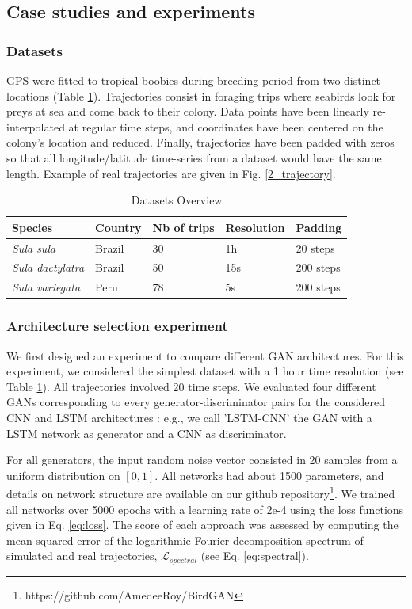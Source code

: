 \documentclass{article}
\begin{document}
\subsection{Case studies and experiments}
\subsubsection{Datasets}
GPS were fitted to tropical boobies during breeding period from two distinct locations (Table \ref{tab_data}). Trajectories consist in foraging trips where seabirds look for preys at sea and come back to their colony. Data points have been linearly re-interpolated at regular time steps, and coordinates have been centered on the colony's location and reduced. Finally, trajectories have been padded with zeros so that all longitude/latitude time-series from a dataset would have the same length. Example of real trajectories are given in Fig. \ref{2_trajectory}.

\begin{table}[h]
 \caption{Datasets Overview}
  \centering
  \begin{tabular}{lllll}
    \toprule
    Species  &  Country  & Nb of trips &  Resolution & Padding \\
    \midrule
    \textit{Sula sula} & Brazil & 30 & 1h & 20 steps \\
    \textit{Sula dactylatra} & Brazil & 50 & 15s & 200 steps\\
    \textit{Sula variegata} & Peru & 78 & 5s & 200 steps \\
    \bottomrule
  \end{tabular}
  \label{tab_data}
\end{table}

\subsubsection{Architecture selection experiment}
We first designed an experiment to compare different GAN architectures. For this experiment, we considered the simplest dataset with a 1 hour time resolution (see Table \ref{tab_data}). All trajectories involved 20 time steps. We evaluated four different GANs corresponding to every generator-discriminator pairs for the considered CNN and LSTM architectures : e.g., we call 'LSTM-CNN' the GAN with a LSTM network as generator and a CNN as discriminator. 

For all generators, the input random noise vector consisted in 20 samples from a uniform distribution on $[0, 1]$. All networks had about 1500 parameters, and details on network structure are available on our github repository\footnote{https://github.com/AmedeeRoy/BirdGAN}. We trained all networks over 5000 epochs with a learning rate of 2e-4 using the loss functions given in Eq. \ref{eq:loss}. The score of each approach was assessed by computing the mean squared error of the logarithmic Fourier decomposition spectrum of simulated and real trajectories, $\mathcal{L}_{spectral}$ (see Eq. \ref{eq:spectral}). 
\end{document}
